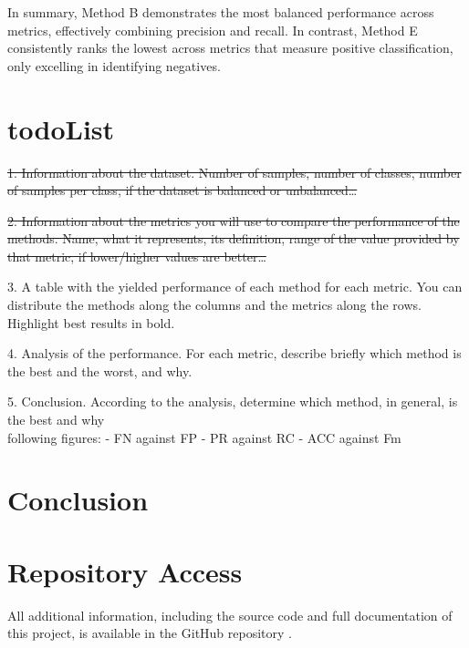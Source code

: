 \documentclass{article}
\begin{document}
In summary, Method B demonstrates the most balanced performance across metrics, effectively combining precision and recall. In contrast, Method E consistently ranks the lowest across metrics that measure positive classification, only excelling in identifying negatives.




\section{todoList}
\sout{1. Information about the dataset. Number of samples, number of classes, 
number of samples per class, if the dataset is balanced or unbalanced…}


\sout{2. Information about the metrics you will use to compare the performance 
	of the methods. Name, what it represents, its definition, range of the 
	value provided by that metric, if lower/higher values are better…}


3. A table with the yielded performance of each method for each metric. 
You can distribute the methods along the columns and the metrics along 
the rows. Highlight best results in bold.


4. Analysis of the performance. For each metric, describe briefly which 
method is the best and the worst, and why.


5. Conclusion. According to the analysis, determine which method, in general, is the best and why\\





following figures: 
- FN against FP
- PR against RC
- ACC against Fm 
\section{Conclusion}


\section{Repository Access}

All additional information, including the source code and full documentation of this project, is available in the GitHub repository \cite{cuevas2024github}.


\end{document}
